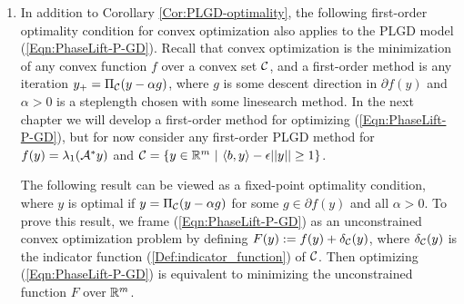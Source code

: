 \begin{enumerate}
\begin{cor}
\begin{enumerate}[(a)]
\item
$\lambda_i(X) \cdot \left( \lambda_1(\caA^* y) - \lambda_i (\caA^* y)  \right) = 0$ for all $i = 1, \ldots, n$;

\item
$X$ and $\caA^*y$ admit a simultaneous ordered eigendecomposition.
\end{enumerate}
\end{cor}
\begin{proof}
Since $\rho^\circ(\cdot) = ||\cdot||$ is continuous, we may invoke Proposition \ref{Prop:opt_conds}. The first four conditions are identical to those discussed in Proposition \ref{Prop:opt_conds} for the more general model (\ref{Eqn:PhaseLift_P_GD_inequality_form}).  Thus these conditions holding is equivalent to $(X,y)$ being primal-dual optimal.

Then we must simply show the first four conditions imply the last two.    Applying the von Neumann trace inequality to the matrices $X$ and $\caA^*y$, we have
\[
1 = \langle X, \caA^*y \rangle \leq \sum_{i=1}^n \sigma_i(X) \sigma_i(\caA^*y) \leq ||X||_1 \cdot \lambda_1(\caA^*y) = 1.
\]
Thus for all $i$, if $\lambda_i(X) > 0$ then we must have $\lambda_i(\caA^*y) = \lambda_1(\caA^*y)$ and the matrices $X$ and $\caA^*y$ admit a simultaneous ordered eigendecomposition.
\end{proof}



\item

In addition to Corollary \ref{Cor:PLGD-optimality}, the following first-order optimality condition for convex optimization also applies to the PLGD model (\ref{Eqn:PhaseLift-P-GD}).  Recall that convex optimization is the minimization of any convex function $f$ over a convex set ${\mathcal C}$, and a first-order method is any iteration $y_+ = \Pi_{\mathcal C}(y - \alpha g)$, where $g$ is some descent direction in $\partial f(y)$ and $\alpha > 0$ is a steplength chosen with some linesearch method.  In the next chapter we will develop a first-order method for optimizing (\ref{Eqn:PhaseLift-P-GD}), but for now consider any first-order PLGD method for $f(y) = \lambda_1({\mathcal A}^*y)$ and ${\mathcal C} = \{ y \in \mathbb{R}^m \ | \ \langle b, y \rangle - \epsilon ||y|| \geq 1 \}$.


The following result can be viewed as a fixed-point optimality condition, where $y$ is optimal if $y = \Pi_{\mathcal C}(y - \alpha g)$ for some $g \in \partial f(y)$ and all $\alpha > 0$.  To prove this result, we frame (\ref{Eqn:PhaseLift-P-GD}) as an unconstrained convex optimization problem by defining $F(y) := f(y) + \delta_{\mathcal C}(y)$, where $\delta_{\mathcal C}(y)$ is the indicator function (\ref{Def:indicator_function}) of ${\mathcal C}$.  Then optimizing (\ref{Eqn:PhaseLift-P-GD}) is equivalent to minimizing the unconstrained function $F$ over ${\mathbb R}^m$.  


\end{enumerate}
